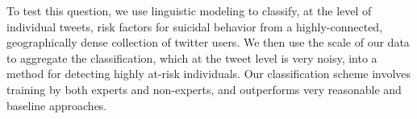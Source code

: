 \documentclass[11pt]{article}
\begin{document}
To test this question, we use linguistic modeling to classify, at the level of individual tweets, risk factors for suicidal  behavior from a highly-connected, geographically dense collection of twitter users. We then use the scale of our data to aggregate the classification, which at the tweet level is very noisy, into a method for detecting highly at-risk individuals. Our classification scheme involves training by both experts and non-experts, and outperforms very reasonable and baseline approaches.

\end{document}
